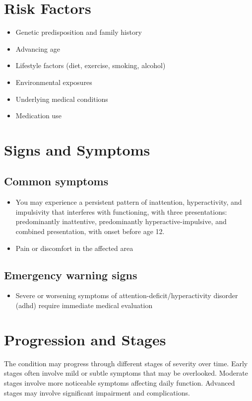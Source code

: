 \section{Risk Factors}
\begin{itemize}[noitemsep]
  \item Genetic predisposition and family history
  \item Advancing age
  \item Lifestyle factors (diet, exercise, smoking, alcohol)
  \item Environmental exposures
  \item Underlying medical conditions
  \item Medication use
\end{itemize}
\section{Signs and Symptoms}

\subsection{Common symptoms}
\begin{itemize}[noitemsep]
  \item You may experience a persistent pattern of inattention, hyperactivity, and impulsivity that interferes with functioning, with three presentations: predominantly inattentive, predominantly hyperactive-impulsive, and combined presentation, with onset before age 12.
  \item Pain or discomfort in the affected area
  \end{itemize}

\subsection{Emergency warning signs}
\begin{itemize}[noitemsep]
  \item Severe or worsening symptoms of attention-deficit/hyperactivity disorder (adhd) require immediate medical evaluation
\end{itemize}
\section{Progression and Stages}
The condition may progress through different stages of severity over time. Early stages often involve mild or subtle symptoms that may be overlooked. Moderate stages involve more noticeable symptoms affecting daily function. Advanced stages may involve significant impairment and complications.
